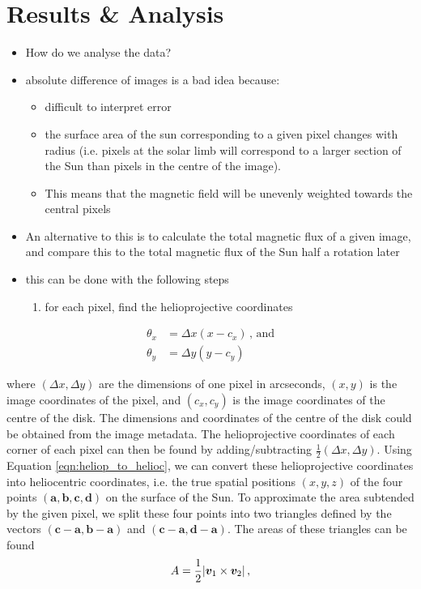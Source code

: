\documentclass[11pt,a4paper,onecolumn]{report}
\DeclarePairedDelimiter{\abs}{\lvert}{\rvert}
\begin{document}
%
%
%
%
%
%
%
%
\chapter{Results \& Analysis}
%
%
%
%
%
%




\begin{itemize}
  \item How do we analyse the data?
  \item absolute difference of images is a bad idea because:
  \begin{itemize}
    \item difficult to interpret error
    \item the surface area of the sun corresponding to a given pixel changes
    with radius (i.e. pixels at the solar limb will correspond to a larger
    section of the Sun than pixels in the centre of the image).
    \item This means that the magnetic field will be unevenly weighted towards
    the central pixels
  \end{itemize}
  \item An alternative to this is to calculate the total magnetic flux of a
  given image, and compare this to the total magnetic flux of the Sun half a
  rotation later
  \item this can be done with the following steps
  \begin{enumerate}
    \item for each pixel, find the helioprojective coordinates
  \end{enumerate}
\end{itemize}

\begin{align}
  \theta_x &= \Delta x (x - c_x) \, \text{, and} \\
  \theta_y &= \Delta y (y - c_y)
\end{align}

where  \((\Delta x, \Delta y)\) are the dimensions of one pixel in arcseconds,
\( (x, y) \) is the image coordinates of the pixel, and \( (c_x, c_y) \) is the
image coordinates of the centre of the disk. The dimensions and coordinates of
the centre of the disk could be obtained from the image metadata. The
helioprojective coordinates of each corner of each pixel can then be found by
adding/subtracting \(\frac{1}{2} (\Delta x, \Delta y)\). Using Equation
\ref{eqn:heliop_to_helioc}, we can convert these helioprojective coordinates
into heliocentric coordinates, i.e. the true spatial positions \((x, y, z)\) of
the four points \((\bm{a}, \bm{b}, \bm{c}, \bm{d})\) on the surface of the Sun.
To approximate the area subtended by the given pixel, we split these four points
into two triangles defined by the vectors \((\bm{c}-\bm{a}, \bm{b} - \bm{a}) \)
and \((\bm{c}-\bm{a}, \bm{d} - \bm{a}) \). The areas of these triangles can be
found 
\begin{align}
  A = \frac{1}{2} \abs*{\bm{v}_1 \times \bm{v}_2} \, ,
\end{align}
\end{document}
